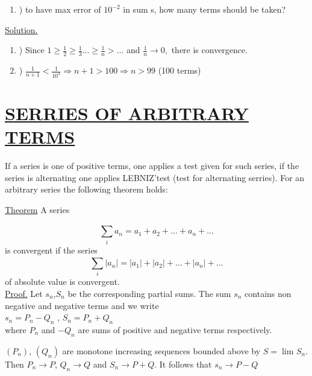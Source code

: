 \documentclass[15pt]{amsbook}
\begin{document}




\begin{enumerate}[label=\alph*]
    \item)  to have max error of $10^{ - 2}$ in sum s, how many terms should be taken?\\
\end{enumerate}


\underline{Solution.}
\begin{enumerate}[label=\alph*]
    \item)  Since $1\geq \frac{1}{2}\geq \frac{1}{3}...\geq \frac{1}{n}>... $ and $ \frac{1}{n}\rightarrow0,$ there is convergence.\\
    
    \item) $ \frac{1}{n+1} < \frac{1}{10^2} \Rightarrow n+1>100  \Rightarrow n>99 $ (100 terms)\\
\end{enumerate}


\section{\underline{SERRIES OF ARBITRARY TERMS}}

If a series is one of positive terms, one applies a test given for such series, if the series is alternating one applies LEBNIZ'test (test for alternating serries). For an arbitrary series the following theorem holds:

\underline{Theorem} A series

$$\sum_{i}^{} a_n = a_1+a_2+...+a_n+...$$
is convergent if the series
$$\sum_{i}^{} |a_n| = |a_1|+|a_2|+...+|a_n|+...$$
of absolute value is convergent.\\

\underline{Proof.} Let $s_n$,$S_n$ be the corresponding partial sums. The sum $s_n$ contains non negative and negative terms and we write\\

$s_n = P_n-Q_n$ , $S_n=P_n + Q_n$\\

where $P_n$ and $-Q_n$ are sums of positive and negative terms respectively.

$(P_n)$, $(Q_n)$ are monotone increasing sequences bounded above by $S = \lim_{} S_n $. Then $P_n \rightarrow P$, $Q_n \rightarrow Q$ and $S_n \rightarrow P + Q$. It follows that $s_n \rightarrow P - Q$






\end{document}
